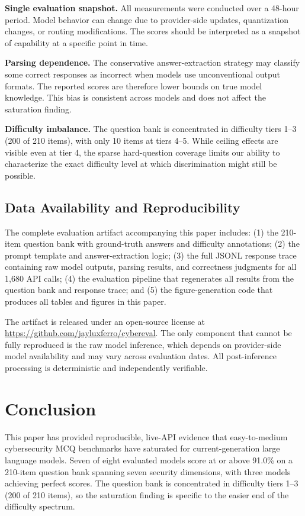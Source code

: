 \documentclass[final]{elsarticle}
\begin{document}
\textbf{Single evaluation snapshot.} All measurements were conducted over a 48-hour period. Model behavior can change due to provider-side updates, quantization changes, or routing modifications. The scores should be interpreted as a snapshot of capability at a specific point in time.

\textbf{Parsing dependence.} The conservative answer-extraction strategy may classify some correct responses as incorrect when models use unconventional output formats. The reported scores are therefore lower bounds on true model knowledge. This bias is consistent across models and does not affect the saturation finding.

\textbf{Difficulty imbalance.} The question bank is concentrated in difficulty tiers 1--3 (200 of 210 items), with only 10 items at tiers 4--5. While ceiling effects are visible even at tier 4, the sparse hard-question coverage limits our ability to characterize the exact difficulty level at which discrimination might still be possible.

\subsection{Data Availability and Reproducibility}

The complete evaluation artifact accompanying this paper includes: (1) the 210-item question bank with ground-truth answers and difficulty annotations; (2) the prompt template and answer-extraction logic; (3) the full JSONL response trace containing raw model outputs, parsing results, and correctness judgments for all 1,680 API calls; (4) the evaluation pipeline that regenerates all results from the question bank and response trace; and (5) the figure-generation code that produces all tables and figures in this paper.

{\sloppy The artifact is released under an open-source license at \url{https://github.com/jayluxferro/cybereval}. The only component that cannot be fully reproduced is the raw model inference, which depends on provider-side model availability and may vary across evaluation dates. All post-inference processing is deterministic and independently verifiable.\par}

\section{Conclusion}

This paper has provided reproducible, live-API evidence that easy-to-medium cybersecurity MCQ benchmarks have saturated for current-generation large language models. Seven of eight evaluated models score at or above 91.0\% on a 210-item question bank spanning seven security dimensions, with three models achieving perfect scores. The question bank is concentrated in difficulty tiers 1--3 (200 of 210 items), so the saturation finding is specific to the easier end of the difficulty spectrum.
\end{document}
